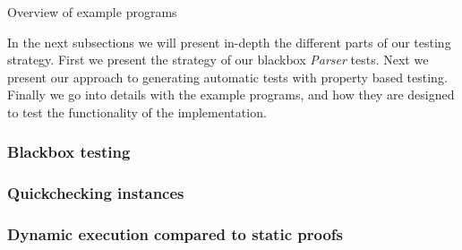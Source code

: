 \begin{table}[h!]

\caption{Overview of example programs}
\label{table:testprograms}
\end{table}

In the next subsections we will present in-depth the different parts of our testing strategy. 
First we present the strategy of our blackbox \textit{Parser} tests. 
Next we present our approach to generating automatic tests with property based testing. 
Finally we go into details with the example programs, and how they are designed to test the functionality of the implementation.

\subsubsection{Blackbox testing}\label{sec:blackbox}


\subsubsection{Quickchecking instances}\label{sec:qc}


\subsubsection{Dynamic execution compared to static proofs}\label{sec:examples}


